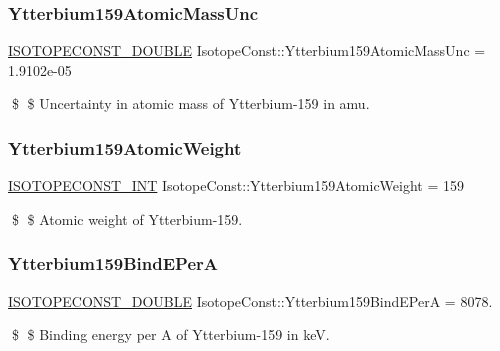 \subsubsection{\texorpdfstring{Ytterbium159\+Atomic\+Mass\+Unc}{Ytterbium159AtomicMassUnc}}
{\footnotesize\ttfamily \mbox{\hyperlink{group___isotope_const-_macros_ga8f45a7272ce02c0b4c65c44636ed719a}{I\+S\+O\+T\+O\+P\+E\+C\+O\+N\+S\+T\+\_\+\+D\+O\+U\+B\+LE}} Isotope\+Const\+::\+Ytterbium159\+Atomic\+Mass\+Unc = 1.\+9102e-\/05}

\$ \$ Uncertainty in atomic mass of Ytterbium-\/159 in amu. \mbox{\label{group___isotope_const-_ytterbium-_yb159_gaef585e6882948ca3ecb2fc2237845bc8}} 
\subsubsection{\texorpdfstring{Ytterbium159\+Atomic\+Weight}{Ytterbium159AtomicWeight}}
{\footnotesize\ttfamily \mbox{\hyperlink{group___isotope_const-_macros_ga5f18360b3e99483a35c32d789e62621c}{I\+S\+O\+T\+O\+P\+E\+C\+O\+N\+S\+T\+\_\+\+I\+NT}} Isotope\+Const\+::\+Ytterbium159\+Atomic\+Weight = 159}

\$ \$ Atomic weight of Ytterbium-\/159. \mbox{\label{group___isotope_const-_ytterbium-_yb159_ga72ba45cd8cb2291f0c5297e8a917f8fe}} 
\subsubsection{\texorpdfstring{Ytterbium159\+Bind\+E\+PerA}{Ytterbium159BindEPerA}}
{\footnotesize\ttfamily \mbox{\hyperlink{group___isotope_const-_macros_ga8f45a7272ce02c0b4c65c44636ed719a}{I\+S\+O\+T\+O\+P\+E\+C\+O\+N\+S\+T\+\_\+\+D\+O\+U\+B\+LE}} Isotope\+Const\+::\+Ytterbium159\+Bind\+E\+PerA = 8078.}

\$ \$ Binding energy per A of Ytterbium-\/159 in keV. \mbox{\label{group___isotope_const-_ytterbium-_yb159_ga7341bc9ab6a9bcb14ac6cb78f070ca91}} 
